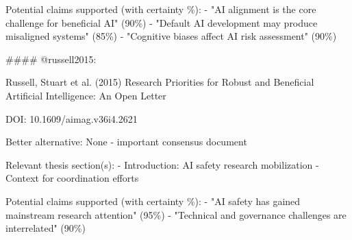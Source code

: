 \documentclass[
  11pt,
  letterpaper,
]{book}
\newenvironment{Shaded}{\begin{snugshade}}{\end{snugshade}}
\newcommand{\FunctionTok}[1]{\textcolor[rgb]{0.28,0.35,0.67}{#1}}
\newcommand{\InformationTok}[1]{\textcolor[rgb]{0.37,0.37,0.37}{#1}}
\begin{document}
\begin{Shaded}
\begin{Highlighting}[]
\InformationTok{    Potential claims supported (with certainty \%):}
\InformationTok{    {-} "AI alignment is the core challenge for beneficial AI" (90\%)}
\InformationTok{    {-} "Default AI development may produce misaligned systems" (85\%)}
\InformationTok{    {-} "Cognitive biases affect AI risk assessment" (90\%)}

\FunctionTok{\#\#\#\# \textasciigrave{}@russell2015\textasciigrave{}: }

\InformationTok{    Russell, Stuart et al. (2015)}
\InformationTok{    Research Priorities for Robust and Beneficial Artificial Intelligence: An Open Letter}

\InformationTok{    DOI: 10.1609/aimag.v36i4.2621}

\InformationTok{    Better alternative: None {-} important consensus document}

\InformationTok{    Relevant thesis section(s):}
\InformationTok{    {-} Introduction: AI safety research mobilization}
\InformationTok{    {-} Context for coordination efforts}

\InformationTok{    Potential claims supported (with certainty \%):}
\InformationTok{    {-} "AI safety has gained mainstream research attention" (95\%)}
\InformationTok{    {-} "Technical and governance challenges are interrelated" (90\%)}
\end{Highlighting}
\end{Shaded}
\end{document}
